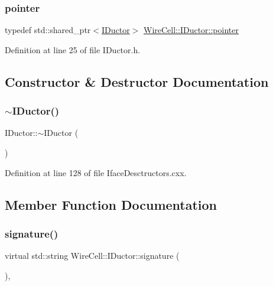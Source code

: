 \subsubsection{\texorpdfstring{pointer}{pointer}}
{\footnotesize\ttfamily typedef std\+::shared\+\_\+ptr$<$\hyperlink{class_wire_cell_1_1_i_ductor}{I\+Ductor}$>$ \hyperlink{class_wire_cell_1_1_i_ductor_a66acc2aebf42b1d47baf40bbbc50e3db}{Wire\+Cell\+::\+I\+Ductor\+::pointer}}



Definition at line 25 of file I\+Ductor.\+h.



\subsection{Constructor \& Destructor Documentation}
\mbox{\label{class_wire_cell_1_1_i_ductor_af6ad8a9fdd4d1df1930f02e6dd15af1c}} 
\subsubsection{\texorpdfstring{$\sim$\+I\+Ductor()}{~IDuctor()}}
{\footnotesize\ttfamily I\+Ductor\+::$\sim$\+I\+Ductor (\begin{DoxyParamCaption}{ }\end{DoxyParamCaption})\hspace{0.3cm}{\ttfamily [virtual]}}



Definition at line 128 of file Iface\+Desctructors.\+cxx.



\subsection{Member Function Documentation}
\mbox{\label{class_wire_cell_1_1_i_ductor_ac1f7ad244c991efc08719c9bbe38367a}} 
\subsubsection{\texorpdfstring{signature()}{signature()}}
{\footnotesize\ttfamily virtual std\+::string Wire\+Cell\+::\+I\+Ductor\+::signature (\begin{DoxyParamCaption}{ }\end{DoxyParamCaption})\hspace{0.3cm}{\ttfamily [inline]}, {\ttfamily [virtual]}}

